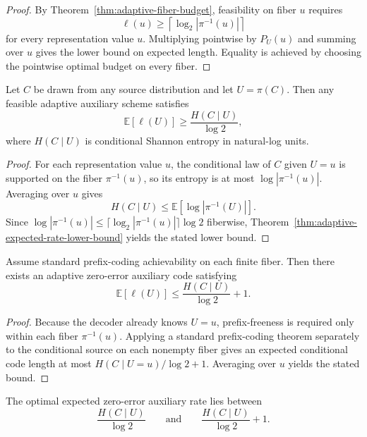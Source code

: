 \begin{proof}
By Theorem~\ref{thm:adaptive-fiber-budget}, feasibility on fiber $u$ requires
\[
\ell(u) \ge \left\lceil \log_2 |\pi^{-1}(u)| \right\rceil
\]
for every representation value $u$. Multiplying pointwise by $P_U(u)$ and summing over $u$ gives the lower bound on expected length. Equality is achieved by choosing the pointwise optimal budget on every fiber.
\end{proof}

\begin{corollary}
Let $C$ be drawn from any source distribution and let $U=\pi(C)$. Then any feasible adaptive auxiliary scheme satisfies
\[
\mathbb E[\ell(U)] \ge \frac{H(C\mid U)}{\log 2},
\]
where $H(C\mid U)$ is conditional Shannon entropy in natural-log units.
\end{corollary}

\begin{proof}
For each representation value $u$, the conditional law of $C$ given $U=u$ is supported on the fiber $\pi^{-1}(u)$, so its entropy is at most $\log |\pi^{-1}(u)|$. Averaging over $u$ gives
\[
H(C\mid U) \le \mathbb E[\log |\pi^{-1}(U)|].
\]
Since $\log |\pi^{-1}(u)| \le \lceil \log_2 |\pi^{-1}(u)| \rceil \log 2$ fiberwise, Theorem~\ref{thm:adaptive-expected-rate-lower-bound} yields the stated lower bound.
\end{proof}

\begin{theorem}\label{thm:fiberwise-prefix-coding-upper-bound}
Assume standard prefix-coding achievability on each finite fiber. Then there exists an adaptive zero-error auxiliary code satisfying
\[
\mathbb E[\ell(U)] \le \frac{H(C\mid U)}{\log 2} + 1.
\]
\end{theorem}

\begin{proof}
Because the decoder already knows $U=u$, prefix-freeness is required only within each fiber $\pi^{-1}(u)$. Applying a standard prefix-coding theorem separately to the conditional source on each nonempty fiber gives an expected conditional code length at most $H(C\mid U=u)/\log 2 + 1$. Averaging over $u$ yields the stated bound.
\end{proof}

\begin{corollary}\label{cor:zero-error-conditional-entropy-sandwich}
The optimal expected zero-error auxiliary rate lies between
\[
\frac{H(C\mid U)}{\log 2}
\qquad\text{and}\qquad
\frac{H(C\mid U)}{\log 2}+1.
\]
\end{corollary}


